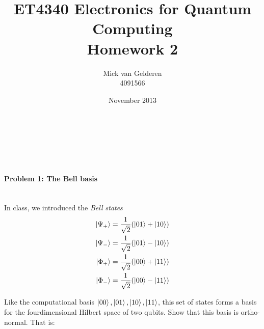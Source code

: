 \documentclass[12pt]{article}
\title{ET4340 Electronics for Quantum Computing\\Homework 2}
\author{
    Mick van Gelderen\\4091566
}
\date{November 2013}
\newcommand{\rsqrt}[1]{\ensuremath{\frac{1}{\sqrt{#1}}}}
\begin{document}
\maketitle
\hfill\\\\\\

\paragraph{Problem 1: The Bell basis} \hfill \\

In class, we introduced the \emph{Bell states}
\begin{align*}
    \ket{\Psi_+} &= \rsqrt{2} (\ket{01} + \ket{10}) \\
    \ket{\Psi_-} &= \rsqrt{2} (\ket{01} - \ket{10}) \\
    \ket{\Phi_+} &= \rsqrt{2} (\ket{00} + \ket{11}) \\
    \ket{\Phi_-} &= \rsqrt{2} (\ket{00} - \ket{11}) \\
\end{align*}

Like the computational basis ${\ket{00}, \ket{01}, \ket{10}, \ket{11}}$, this set of states forms a basis for the fourdimensional Hilbert space of two qubits. Show that this basis is ortho-normal. That is:
\end{document}
